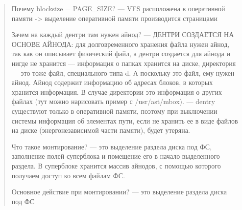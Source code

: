 \begin{quote}
Почему blocksize = PAGE\_SIZE? --- VFS расположена в оперативной памяти -> выделение оперативной памяти производится страницами
 
Зачем на каждый дентри там нужен айнод? --- ДЕНТРИ СОЗДАЕТСЯ НА ОСНОВЕ АЙНОДА: для долговременного хранения файла нужен айнод, так как он описывает физический файл, а дентри создается для айнода и нигде не хранится --- информация о папках хранится на диске, директория — это тоже файл, специального типа d. А поскольку это файл, ему нужен айнод. Айнод содержит информацию об адресах блоков, в которых хранится информация. В случае директории это информация о других файлах (тут можно нарисовать пример с /usr/ast/mbox). --- dentry существуют только в оперативной памяти, поэтому при выключении системы информация об элементах пути, если не хранить ее в виде файлов на диске (энергонезависимой части памяти), будет утеряна.

Что такое монтирование? --- это выделение раздела диска под ФС, заполнение полей суперблока и помещение его в начало выделенного раздела. В суперблоке хранится массив айнодов, с помощью которого получаем доступ ко всем файлам ФС.

Основное действие при монтировании? --- это выделение раздела диска под ФС
\end{quote}

